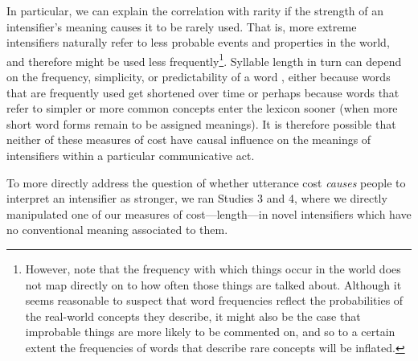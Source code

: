 In particular, we can explain the correlation with rarity if the strength of an intensifier's meaning causes it to be rarely used.
That is, more extreme intensifiers naturally refer to less probable events and properties in the world, and therefore might be used less frequently\footnote{
However, note that the frequency with which things occur in the world does not map directly on to how often those things are talked about. 
Although it seems reasonable to suspect that word frequencies reflect the probabilities of the real-world concepts they describe, it might also be the case that improbable things are more likely to be commented on, and so to a certain extent the frequencies of words that describe rare concepts will be inflated. 
}.
Syllable length in turn can depend on the frequency, simplicity, or predictability of a word \cite{zipf_psycho-biology_1935, lewis_conceptual_2016, mahowald_info/information_2013}, either because words that are frequently used get shortened over time \cite{kanwal_evolution_2016} or perhaps because words that refer to simpler or more common concepts enter the lexicon sooner (when more short word forms remain to be assigned meanings).
It is therefore possible that neither of these measures of cost have causal influence on the meanings of intensifiers within a particular communicative act.

To more directly address the question of whether utterance cost \emph{causes} people to interpret an intensifier as stronger, we ran Studies 3 and 4, where we directly manipulated one of our measures of cost---length---in novel intensifiers which have no conventional meaning associated to them. 


\renewcommand{\baselinestretch}{0.7}


